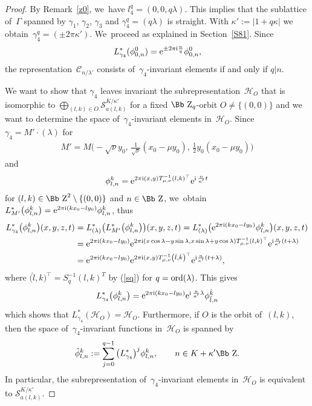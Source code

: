 \documentclass[pdftex]{sigma}
\newcommand\ZZ{{\mbox{\Bb Z}}}
\newcommand\cC{{\mathcal C}}
\newcommand\cH{{\mathcal H}}
\newcommand{\ord}{{\rm ord}}
\numberwithin{equation}{section}
\begin{document}
\begin{proof} By Remark~\ref{z0}, we~have $l_4^q=(0,0,q\lambda)$. This implies that the sublattice of~$\Gamma$ spanned by $\gamma_1$, $\gamma_2$, $\gamma_3$ and $\gamma_4^q=(q\lambda)$ is straight. With $\kappa':=|1+q\kappa|$ we obtain~$\gamma_4^q=(\pm 2\pi\kappa')$. We~proceed as explained in Section~\ref{S81}. Since
\begin{gather*}
L_{\gamma_4}^*(\phi^0_{0,n})={\rm e}^{\pm2\pi {\rm i} \frac nq} \phi^0_{0,n},
\end{gather*}
the representation~$\cC_{n/\lambda'}$ consists of~$\gamma_4$-invariant elements if and only if $q|n$.

We want to show that $\gamma_4$ leaves invariant the subrepresentation~$\cH_O$ that is isomorphic to $\bigoplus _{(l,k)\in O} {\mathcal S}_{a(l,k)}^{K/\kappa'}$ for a fixed $\ZZ_q$-orbit $O\not=\{(0,0)\}$ and we want to determine the space of~$\gamma_4$-invariant elements in~$\cH_O$. Since $\gamma_4=M'\cdot(\lambda)$ for
\begin{gather*}
M'=M\bigg({-}\sqrt\nu y_0,\,\frac1{\sqrt\nu}(x_0-\mu y_0),\,\frac12 y_0(x_0-\mu y_0)\bigg)
\end{gather*}
and
\begin{gather*}
\phi_{l,n}^k={\rm e}^{2\pi {\rm i}(x,y)T_{\mu,\nu}^{-1}( l, k)^\top} {\rm e}^{{\rm i}\,\frac n{\kappa'} t}
\end{gather*}
for $(l,k)\in \ZZ^2\setminus \{(0,0)\}$ and $n\in \ZZ$, we~obtain~$L^*_{M'}\big(\phi^k_{l,n}\big)={\rm e}^{2\pi {\rm i}(kx_0-ly_0)}\phi^k_{l,n}$, thus
\begin{align*}
L_{\gamma_4}^*\big(\phi^k_{l,n}\big)(x,y,z,t) &= L_{(\lambda)}^*\big(L_{M'}^*\big(\phi^k_{l,n}\big)\big)(x,y,z,t)
=L_{(\lambda)}^*\big({\rm e}^{2\pi {\rm i}(kx_0-ly_0)}\phi^k_{l,n}\big)(x,y,z,t)
\\
&={\rm e}^{2\pi {\rm i}(kx_0-ly_0)} {\rm e}^{2\pi {\rm i}(x\cos\lambda-y\sin\lambda,x\sin\lambda+y\cos \lambda)T_{\mu,\nu}^{-1}(l,k)^\top}{\rm e}^{{\rm i} \frac n{\kappa'} (t+\lambda)}
\\
&={\rm e}^{2\pi {\rm i}(kx_0-ly_0)}{\rm e}^{2\pi {\rm i}(x,y)T_{\mu,\nu}^{-1}\left(\hat l,\hat k\right)^\top}{\rm e}^{{\rm i} \frac n{\kappa'} (t+\lambda)},
\end{align*}
where $\big(\hat l,\hat k\big)^\top=S^{-1}_q(l,k)^T$ by (\ref{sq}) for $q=\ord(\lambda)$. This gives
\begin{gather*}
L_{\gamma_4}^*\big(\phi^k_{l,n}\big)={\rm e}^{2\pi {\rm i}(kx_0-ly_0)}{\rm e}^{{\rm i}\,\frac n{\kappa'} \lambda}\phi_{\hat l,n}^{\hat k}
\end{gather*}
which shows that $L^*_{\gamma_4}(\cH_O)=\cH_O$. Furthermore, if $O$ is the orbit of~$(l,k)$, then the space of~$\gamma_4$-invariant functions in~$\cH_O$ is spanned by
\begin{gather*}
\hat \phi_{l,n}^k:=\sum_{j=0}^{q-1}\big(L^*_{\gamma_4}\big)^j\phi_{l,n}^k,\qquad
n\in K+\kappa'\ZZ.
\end{gather*}
In particular, the subrepresentation of~$\gamma_4$-invariant elements in~$\cH_O$ is equivalent to ${\mathcal S}_{a(l,k)}^{K/\kappa'}$.
\end{proof}
%
\end{document}
